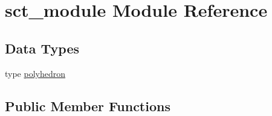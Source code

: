 \hypertarget{classsct__module}{\section{sct\+\_\+module Module Reference}
\label{classsct__module}
}
\subsection*{Data Types}
\begin{DoxyCompactItemize}
\item 
type \hyperlink{structsct__module_1_1polyhedron}{polyhedron}
\end{DoxyCompactItemize}
\subsection*{Public Member Functions}
